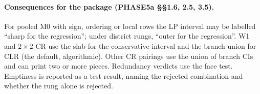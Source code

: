 \paragraph{Consequences for the package (PHASE5a \S\S1.6, 2.5, 3.5).} For pooled
M0 with sign, ordering or local rows the LP interval may be labelled ``sharp for
the regression''; under district rungs, ``outer for the regression''. W1 and
$2\times2$ CR use the slab for the conservative interval and the branch union for
CLR (the default, algorithmic). Other CR pairings use the union of branch CIs and
can print two or more pieces. Redundancy verdicts use the face test. Emptiness is
reported as a test result, naming the rejected combination and whether the rung
alone is rejected.
